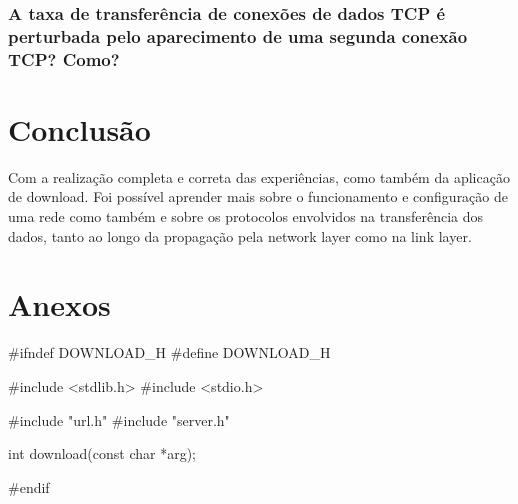 \documentclass[11pt,a4paper,twocolumn]{article}
\begin{document}
\subsubsection{A taxa de transferência de conexões de dados TCP é perturbada pelo aparecimento de uma segunda conexão TCP? Como?}





\section{Conclusão}

Com a realização completa e correta das experiências, como também da aplicação de download. Foi possível aprender mais sobre o funcionamento e configuração de uma rede como também e sobre os protocolos envolvidos na transferência dos dados, tanto ao longo da propagação pela network layer como na link layer.



\section{Anexos}

\begin{c-darktheme}
    #ifndef DOWNLOAD_H
    #define DOWNLOAD_H

    #include <stdlib.h>
    #include <stdio.h>

    #include "url.h"
    #include "server.h"

    int download(const char *arg);

    #endif
\end{c-darktheme}

\begin{c-darktheme}

\end{c-darktheme}

\begin{c-darktheme}

\end{c-darktheme}

\begin{c-darktheme}

\end{c-darktheme}

\begin{c-darktheme}

\end{c-darktheme}

\begin{c-darktheme}

\end{c-darktheme}

\begin{c-darktheme}

\end{c-darktheme}

\begin{c-darktheme}

\end{c-darktheme}
\end{document}
